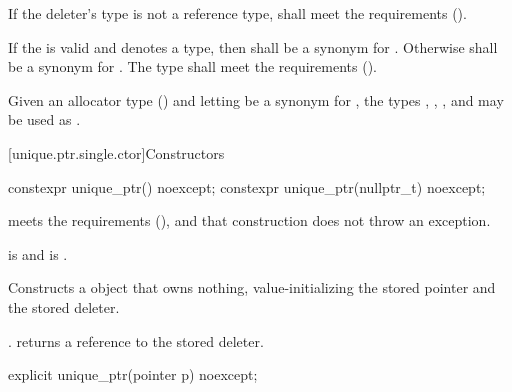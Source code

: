 \pnum
If the deleter's type  is not a reference type,  shall meet
the  requirements ().

\pnum
If the   is valid and denotes a
type, then  shall be a synonym for . Otherwise
 shall be a synonym for . The type  shall
meet the  requirements ().

\pnum
\begin{example}
Given an allocator type  () and
letting  be a synonym for , the types ,
, , and 
may be used as .
\end{example}

[unique.ptr.single.ctor]{Constructors}

%
\begin{itemdecl}
constexpr unique_ptr() noexcept;
constexpr unique_ptr(nullptr_t) noexcept;
\end{itemdecl}

\begin{itemdescr}
\pnum
\expects
{} meets the  requirements (),
and that construction does not throw an exception.

\pnum
\constraints
{} is  and
 is .

\pnum
\effects
Constructs a  object that owns
nothing, value-initializing the stored pointer and the stored deleter.

\pnum
\ensures
{}. 
returns a reference to the stored deleter.
\end{itemdescr}

%
\begin{itemdecl}
explicit unique_ptr(pointer p) noexcept;
\end{itemdecl}

